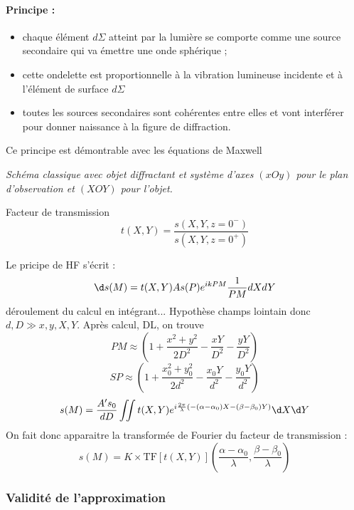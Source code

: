 \paragraph{Principe :}
\begin{itemize}
\item chaque élément $d\Sigma$ atteint par la lumière se comporte comme une source secondaire qui va émettre une onde sphérique ;
\item cette ondelette est proportionnelle à la vibration lumineuse incidente et à l'élément de surface $d\Sigma$
\item toutes les sources secondaires sont cohérentes entre elles et vont interférer pour donner naissance à la figure de diffraction.
\end{itemize}
Ce principe est démontrable avec les équations de Maxwell

\emph{Schéma classique avec objet diffractant et système d'axes $(xOy)$ pour le plan d'observation et $(XOY)$ pour l'objet.}

Facteur de transmission
\begin{equation}
t(X,Y) = \frac{s(X,Y, z=0^-)}{s(X,Y, z=0^+)}
\end{equation}

Le pricipe de HF s'écrit :
\begin{equation}
\d s(M) = t(X,Y) A s(P) e^{ikPM} \frac{1}{PM} dX dY
\end{equation}
déroulement du calcul en intégrant...
Hypothèse champs lointain donc $d, D \gg x, y, X, Y$.
Après calcul, DL, on trouve
\begin{equation}
PM \approx \left( 1 + \frac{x^2+y^2}{2D^2} - \frac{xY}{D^2} - \frac{yY}{D^2}\right) 
\end{equation}
\begin{equation}
SP \approx \left( 1 + \frac{x_0^2+y_0^2}{2d^2} - \frac{x_0Y}{d^2} - \frac{y_0Y}{d^2}\right) 
\end{equation}
\begin{equation}
s(M) = \frac{A's_0}{dD} \iint t(X,Y)e^{i \frac{2\pi}{\lambda} \left( -(\alpha - \alpha_0)X - (\beta-\beta_0) Y \right)} \d X \d Y
\end{equation}
On fait donc apparaitre la transformée de Fourier du facteur de transmission :
\begin{equation}
s(M) = K \times \mathrm{TF}[t(X,Y)]\left(\frac{\alpha-\alpha_0}{\lambda}, \frac{\beta-\beta_0}{\lambda} \right)
\end{equation}

\subsubsection{Validité de l'approximation}

